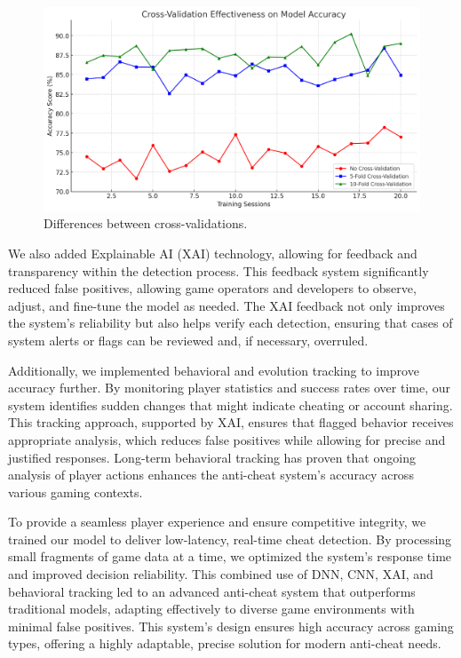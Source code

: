 \begin{figure}[h]
\centering
\includegraphics[width=0.8\linewidth]{images/cross-validation.png}
\captionsetup{width=0.8\textwidth}
\caption{\label{fig:crossvalidation}Differences between cross-validations.}
\end{figure}

We also added Explainable AI (XAI) technology, allowing for feedback and transparency within the detection process. This feedback system significantly reduced false positives, allowing game operators and developers to observe, adjust, and fine-tune the model as needed. The XAI feedback not only improves the system’s reliability but also helps verify each detection, ensuring that cases of system alerts or flags can be reviewed and, if necessary, overruled.

Additionally, we implemented behavioral and evolution tracking to improve accuracy further. By monitoring player statistics and success rates over time, our system identifies sudden changes that might indicate cheating or account sharing. This tracking approach, supported by XAI, ensures that flagged behavior receives appropriate analysis, which reduces false positives while allowing for precise and justified responses. Long-term behavioral tracking has proven that ongoing analysis of player actions enhances the anti-cheat system’s accuracy across various gaming contexts.

To provide a seamless player experience and ensure competitive integrity, we trained our model to deliver low-latency, real-time cheat detection. By processing small fragments of game data at a time, we optimized the system’s response time and improved decision reliability. This combined use of DNN, CNN, XAI, and behavioral tracking led to an advanced anti-cheat system that outperforms traditional models, adapting effectively to diverse game environments with minimal false positives. This system’s design ensures high accuracy across gaming types, offering a highly adaptable, precise solution for modern anti-cheat needs.

